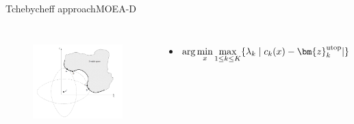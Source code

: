 \begin{frame}{Tchebycheff approach}{MOEA-D}
	\begin{columns}
		\begin{figure}
			\centering
			\includegraphics[width=\linewidth]{figure/tchebycheff}
			\label{fig:tchebycheff}
		\end{figure}
		\begin{minipage}{\textwidth}
			\begin{itemize}[leftmargin=*]
				\item \begin{equation}
				\nonumber
				\arg\min_x \max_{1 \leq k \leq K}  \{ \lambda_{k} \mid c_{k}(x) - \bm{z}^{\rm utop}_{k}  | \} 
				\end{equation}
			\end{itemize}
		\end{minipage}
	\end{columns}
\end{frame}

